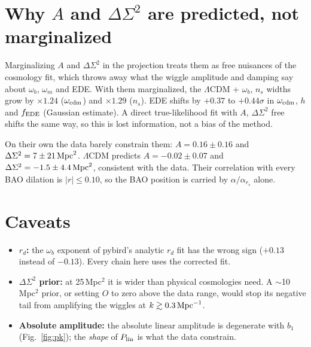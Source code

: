 \documentclass[11pt]{article}
\begin{document}
\section*{Why $A$ and $\Delta\Sigma^2$ are predicted, not marginalized}
Marginalizing $A$ and $\Delta\Sigma^2$ in the projection treats them as free nuisances of the cosmology fit, which throws
away what the wiggle amplitude and damping say about $\omega_b$, $\omega_m$ and EDE. With them marginalized, the
$\Lambda$CDM + $\omega_b$, $n_s$ widths grow by $\times1.24$ ($\omega_{\rm cdm}$) and $\times1.29$ ($n_s$). EDE shifts by
$+0.37$ to $+0.44\sigma$ in $\omega_{\rm cdm}$, $h$ and $f_{\rm EDE}$ (Gaussian estimate). A direct true-likelihood fit with
$A$, $\Delta\Sigma^2$ free shifts the same way, so this is lost information, not a bias of the method.

On their own the data barely constrain them: $A=0.16\pm0.16$ and $\Delta\Sigma^2=7\pm21\,{\rm Mpc}^2$. $\Lambda$CDM
predicts $A=-0.02\pm0.07$ and $\Delta\Sigma^2=-1.5\pm4.4\,{\rm Mpc}^2$, consistent with the data. Their correlation with
every BAO dilation is $|r|\le0.10$, so the BAO position is carried by $\alpha/\alpha_{r_s}$ alone.

\section*{Caveats}
\begin{itemize}\itemsep1pt
\item \textbf{$r_d$:} the $\omega_b$ exponent of pybird's analytic $r_d$ fit has the wrong sign ($+0.13$ instead of
  $-0.13$). Every chain here uses the corrected fit.
\item \textbf{$\Delta\Sigma^2$ prior:} at 25\,Mpc$^2$ it is wider than physical cosmologies need. A $\sim$10\,Mpc$^2$
  prior, or setting $O$ to zero above the data range, would stop its negative tail from amplifying the wiggles at
  $k\gtrsim0.3\,{\rm Mpc}^{-1}$.
\item \textbf{Absolute amplitude:} the absolute linear amplitude is degenerate with $b_1$ (Fig.~\ref{fig:pk}); the
  \emph{shape} of $P_{\rm lin}$ is what the data constrain.
\end{itemize}
\clearpage
\end{document}
